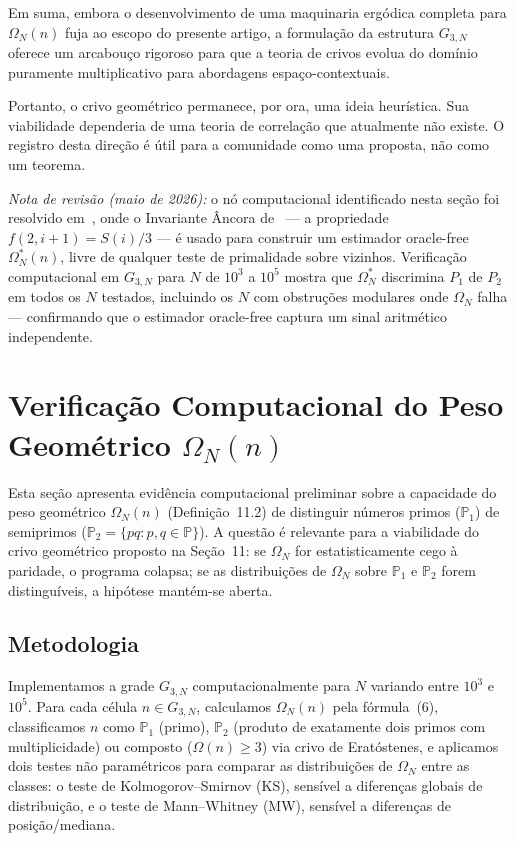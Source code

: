 \documentclass[12pt,a4paper]{article}
\theoremstyle{remark}
\begin{document}
	Em suma, embora o desenvolvimento de uma maquinaria ergódica completa para $\Omega_N(n)$ fuja ao escopo do presente artigo, a formulação da estrutura $G_{3,N}$ oferece um arcabouço rigoroso para que a teoria de crivos evolua do domínio puramente multiplicativo para abordagens espaço-contextuais.
	
	Portanto, o crivo geométrico permanece, por ora, uma ideia heurística. Sua viabilidade dependeria de uma teoria de correlação que atualmente não existe. O registro desta direção é útil para a comunidade como uma proposta, não como um teorema.
	
	\medskip
	\noindent\textit{Nota de revisão (maio de 2026):} o nó computacional
	identificado nesta seção foi resolvido em~\cite{bandeira2026ancora}, onde o
	Invariante Âncora de~\cite{bandeira2026propriedade} --- a propriedade
	$f(2,i{+}1)=S(i)/3$ --- é usado para construir um estimador oracle-free
	$\Omega^*_N(n)$, livre de qualquer teste de primalidade sobre vizinhos.
	Verificação computacional em $G_{3,N}$ para $N$ de $10^3$ a $10^5$ mostra
	que $\Omega^*_N$ discrimina $P_1$ de $P_2$ em todos os $N$ testados, incluindo
	os $N$ com obstruções modulares onde $\Omega_N$ falha --- confirmando que o
	estimador oracle-free captura um sinal aritmético independente.
	
	\section{Verificação Computacional do Peso Geométrico $\Omega_N(n)$}
	\label{sec:computacional}
	
	Esta seção apresenta evidência computacional preliminar sobre a capacidade
	do peso geométrico $\Omega_N(n)$ (Definição~11.2) de distinguir números
	primos ($\mathbb{P}_1$) de semiprimos ($\mathbb{P}_2 = \{pq : p,q \in \mathbb{P}\}$).
	A questão é relevante para a viabilidade do crivo geométrico proposto na
	Seção~11: se $\Omega_N$ for estatisticamente cego à paridade, o programa
	colapsa; se as distribuições de $\Omega_N$ sobre $\mathbb{P}_1$ e $\mathbb{P}_2$
	forem distinguíveis, a hipótese mantém-se aberta.
	
	\subsection{Metodologia}
	
	Implementamos a grade $G_{3,N}$ computacionalmente para $N$ variando entre
	$10^3$ e $10^5$. Para cada célula $n \in G_{3,N}$, calculamos $\Omega_N(n)$
	pela fórmula~(6), classificamos $n$ como $\mathbb{P}_1$ (primo), $\mathbb{P}_2$
	(produto de exatamente dois primos com multiplicidade) ou composto
	($\Omega(n) \geq 3$) via crivo de Eratóstenes, e aplicamos dois testes não
	paramétricos para comparar as distribuições de $\Omega_N$ entre as classes:
	o teste de Kolmogorov--Smirnov (KS), sensível a diferenças globais de
	distribuição, e o teste de Mann--Whitney (MW), sensível a diferenças de
	posição/mediana.
	
\end{document}
